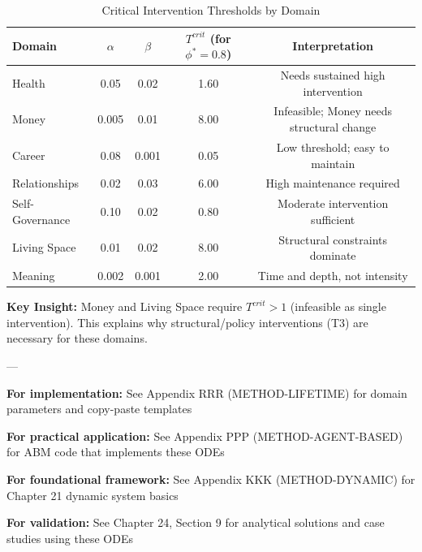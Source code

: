\begin{table}[htbp]
\centering
\caption{Critical Intervention Thresholds by Domain}
\label{tab:ooo-critical}
\renewcommand{\arraystretch}{1.2}
\small
\begin{tabular}{@{}lcccc@{}}
\toprule
\textbf{Domain} & $\alpha$ & $\beta$ & $T^{crit}$ (for $\phi^* = 0.8$) & \textbf{Interpretation} \\
\midrule
Health & 0.05 & 0.02 & 1.60 & Needs sustained high intervention \\
Money & 0.005 & 0.01 & 8.00 & Infeasible; Money needs structural change \\
Career & 0.08 & 0.001 & 0.05 & Low threshold; easy to maintain \\
Relationships & 0.02 & 0.03 & 6.00 & High maintenance required \\
Self-Governance & 0.10 & 0.02 & 0.80 & Moderate intervention sufficient \\
Living Space & 0.01 & 0.02 & 8.00 & Structural constraints dominate \\
Meaning & 0.002 & 0.001 & 2.00 & Time and depth, not intensity \\
\bottomrule
\end{tabular}
\end{table}

\textbf{Key Insight:} Money and Living Space require $T^{crit} > 1$ (infeasible as single intervention).
This explains why structural/policy interventions (T3) are necessary for these domains.

---


\vspace{1cm}

\begin{tcolorbox}[colback=green!5!white, colframe=green!75!black, title=Relationship to Other Appendices]

\textbf{For implementation:} See Appendix RRR (METHOD-LIFETIME) for domain parameters and copy-paste templates

\textbf{For practical application:} See Appendix PPP (METHOD-AGENT-BASED) for ABM code that implements these ODEs

\textbf{For foundational framework:} See Appendix KKK (METHOD-DYNAMIC) for Chapter 21 dynamic system basics

\textbf{For validation:} See Chapter 24, Section 9 for analytical solutions and case studies using these ODEs

\end{tcolorbox}


